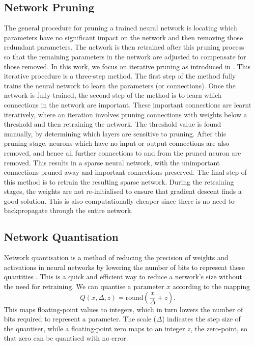 \documentclass[conference]{IEEEtran}
\begin{document}
\subsection{Network Pruning}
The general procedure for pruning a trained neural network is locating which parameters have no significant impact on the network and then removing those redundant parameters. The network is then retrained after this pruning process so that the remaining parameters in the network are adjusted to compensate for those removed. In this work, we focus on iterative pruning as introduced in \cite{han2015alearning}. This iterative procedure is a three-step method. The first step of the method fully trains the neural network to learn the parameters (or connections). Once the network is fully trained, the second step of the method is to learn which connections in the network are important. These important connections are learnt iteratively, where an iteration involves pruning connections with weights below a threshold and then retraining the network.  The threshold value is found manually, by determining which layers are sensitive to pruning.  After this pruning stage, neurons which have no input or output connections are also removed, and hence all further connections to and from the pruned neuron are removed.  This results in a sparse neural network, with the unimportant connections pruned away and important connections preserved. The final step of this method is to retrain the resulting sparse network. During the retraining stages, the weights are not re-initialised to ensure that gradient descent finds a good solution. This is also computationally cheaper since there is no need to backpropagate through the entire network.


\subsection{Network Quantisation}
Network quantisation is a method of reducing the precision of weights and activations in neural networks by lowering the number of bits to represent these quantities \cite{krishnamoorthi2018quantizing}. This is a quick and efficient way to reduce a network's size without the need for retraining. We can quantise a parameter $x$ according to the mapping
\begin{equation}
    Q(x, \Delta, z) = \text{round}(\frac{x}{\Delta} + z).
\end{equation}
This maps floating-point values to integers, which in turn lowers the number of bits required to represent a parameter. The scale ($\Delta$) indicates the step size of the quantiser, while a floating-point zero maps to an integer $z$, the zero-point, so that zero can be quantised with no error.
\end{document}
